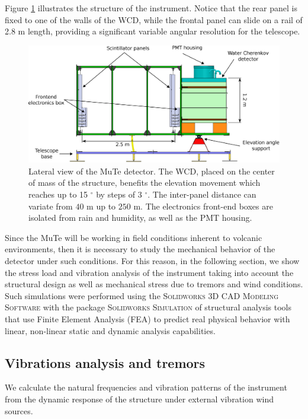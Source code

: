 \documentclass[letterpaper,11pt]{article}
\begin{document}
Figure \ref{fig:Structure} illustrates the structure of the instrument. Notice that the rear panel is fixed to one of the walls of the WCD, while the frontal panel can slide on a rail of 2.8 m length, providing a significant variable angular resolution for the telescope. 

\begin{figure}[htb]
\centering
\includegraphics[width=1\columnwidth]{Figures/Detector.eps}
\caption{Lateral view of the MuTe detector. The WCD, placed on the center of mass of the structure, benefits the elevation movement which reaches up to 15 $^{\circ}$ by steps of 3 $^{\circ}$. The inter-panel distance can variate from  $40$ m up to $250$ m. The electronics front-end boxes are isolated from rain and humidity, as well as the PMT housing.}
  \label{fig:Structure}
\end{figure}

Since the MuTe will be working in field conditions inherent to volcanic environments, then it is necessary to study the mechanical behavior of the detector under such conditions. For this reason, in the following section, we show the stress load and vibration analysis of the instrument taking into account the structural design as well as mechanical stress due to tremors and wind conditions. Such simulations were performed using the \textsc{Solidworks 3D CAD Modeling Software} with the package \textsc{Solidworks Simulation} of structural analysis tools that use Finite Element Analysis (FEA) to predict real physical behavior with linear, non-linear static and dynamic analysis capabilities.

\subsection{Vibrations analysis and tremors}
We calculate the natural frequencies and vibration patterns of the instrument from the dynamic response of the structure under external vibration wind sources. 
\end{document}
